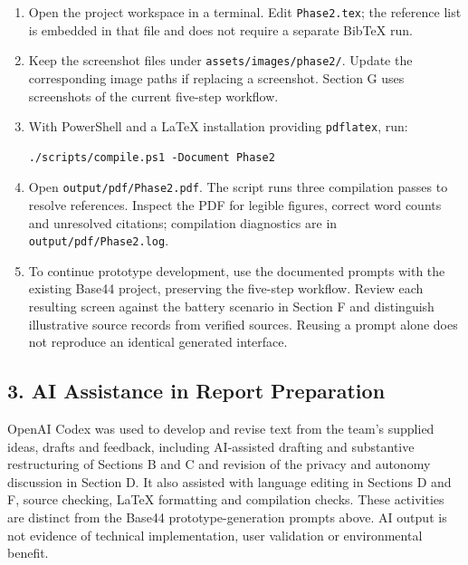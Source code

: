 \documentclass[11pt,a4paper]{article}
\begin{document}
\begin{enumerate}[leftmargin=*]
\item Open the project workspace in a terminal. Edit \texttt{Phase2.tex}; the reference list is embedded in that file and does not require a separate BibTeX run.
\item Keep the screenshot files under \texttt{assets/images/phase2/}. Update the corresponding image paths if replacing a screenshot. Section G uses screenshots of the current five-step workflow.
\item With PowerShell and a LaTeX installation providing \texttt{pdflatex}, run:
\begin{lstlisting}
./scripts/compile.ps1 -Document Phase2
\end{lstlisting}
\item Open \texttt{output/pdf/Phase2.pdf}. The script runs three compilation passes to resolve references. Inspect the PDF for legible figures, correct word counts and unresolved citations; compilation diagnostics are in \texttt{output/pdf/Phase2.log}.
\item To continue prototype development, use the documented prompts with the existing Base44 project, preserving the five-step workflow. Review each resulting screen against the battery scenario in Section F and distinguish illustrative source records from verified sources. Reusing a prompt alone does not reproduce an identical generated interface.
\end{enumerate}

\subsection*{3. AI Assistance in Report Preparation}

\noindent OpenAI Codex was used to develop and revise text from the team's supplied ideas, drafts and feedback, including AI-assisted drafting and substantive restructuring of Sections B and C and revision of the privacy and autonomy discussion in Section D. It also assisted with language editing in Sections D and F, source checking, LaTeX formatting and compilation checks. These activities are distinct from the Base44 prototype-generation prompts above. AI output is not evidence of technical implementation, user validation or environmental benefit.
\end{document}
